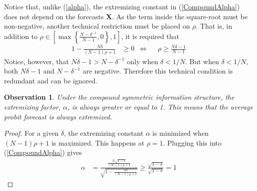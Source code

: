 \documentclass[11pt,twoside]{article}
\newtheorem{observation}[theorem]{Observation}
\begin{document}
Notice that, unlike (\ref{alpha}), the extremizing constant in (\ref{CompoundAlpha}) does not depend on the forecasts $\boldsymbol{X}$. As the term inside the square-root must be non-negative, another technical restriction must be placed on $\rho$. That is, in addition to $\rho \in \left[  \max \left\{ \frac{N-\delta^{-1}}{N-1}, 0\right\}, 1 \right]$, it is required that
\begin{align*}
1- \frac{N\delta}{(N-1)\rho +1}  &\geq 0 &\Leftrightarrow&& \rho \geq \frac{N\delta - 1}{N-1}
\end{align*}
Notice, however, that $N\delta - 1 > N - \delta^{-1}$ only when $\delta < 1/N$. But when $\delta < 1/N$, both $N\delta - 1$ and $N - \delta^{-1}$ are negative. Therefore this technical condition is redundant and can be ignored. 


\begin{observation}
\label{positiveThm}
Under the compound symmetric information structure, the extremizing factor, $\alpha$, is always greater or equal to 1. This means that the average probit forecast is always extremized. 
\end{observation}
\begin{proof} 
For a given $\delta$, the extremizing constant $\alpha$ is minimized when $(N-1)\rho +1$ is maximized. This happens at $\rho = 1$. Plugging this into (\ref{CompoundAlpha}) gives
\begin{align*}
\alpha &= \frac{\frac{N\sqrt{1-\delta}}{(N-1)\rho +1}}{\sqrt{1- \frac{N\delta}{(N-1)\rho +1} }}  \geq \frac{\sqrt{1-\delta}}{\sqrt{1-\delta }} = 1
\end{align*}
\end{proof}
\end{document}
